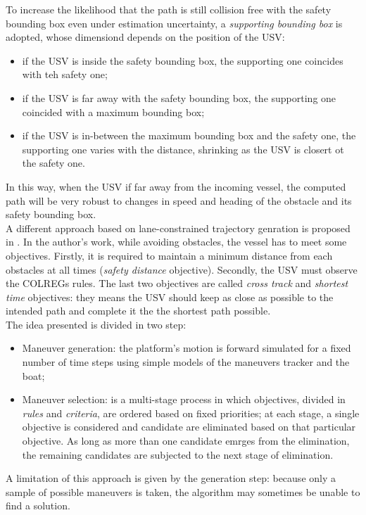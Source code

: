 \documentclass[journal]{IEEEtran}
\begin{document}
  To increase the likelihood that the path is still collision free with the safety bounding box even under estimation uncertainty, a \textit{supporting bounding box} is adopted, whose dimensiond depends on the position of the USV:
  \begin{itemize}
        \item if the USV is inside the safety bounding box, the supporting one coincides with teh safety one;
        \item if the USV is far away with the safety bounding box, the supporting one coincided with a maximum bounding box;
        \item if the USV is in-between the maximum bounding box and the safety one, the supporting one varies with the distance, shrinking as the USV is closert ot the safety one.
  \end{itemize}
  In this way, when the USV if far away from the incoming vessel, the computed path will be very robust to changes in speed and heading of the obstacle and its safety bounding box.\\

  A different approach based on lane-constrained trajectory genration is proposed in \cite{Tan2010}. In the author's work, while avoiding obstacles, the vessel has to meet some objectives. Firstly, it is required to maintain a minimum distance from each obstacles at all times (\textit{safety distance} objective). Secondly, the USV must observe the COLREGs rules. The last two objectives are called \textit{cross track} and \textit{shortest time} objectives: they means the USV should keep as close as possible to the intended path and complete it the the shortest path possible.\\
  The idea presented is divided in two step:
  \begin{itemize}
        \item Maneuver generation: the platform's motion is forward simulated for a fixed number of time steps using simple models of the maneuvers tracker and the boat;
        \item Maneuver selection: is a multi-stage process in which objectives, divided in \textit{rules} and \textit{criteria}, are ordered based on fixed priorities; at each stage, a single objective is considered and candidate are eliminated based on that particular objective. As long as more than one candidate emrges from the elimination, the remaining candidates are subjected to the next stage of elimination.
  \end{itemize}
  A limitation of this approach is given by the generation step: because only a sample of possible maneuvers is taken, the algorithm may sometimes be unable to find a solution.
\end{document}
